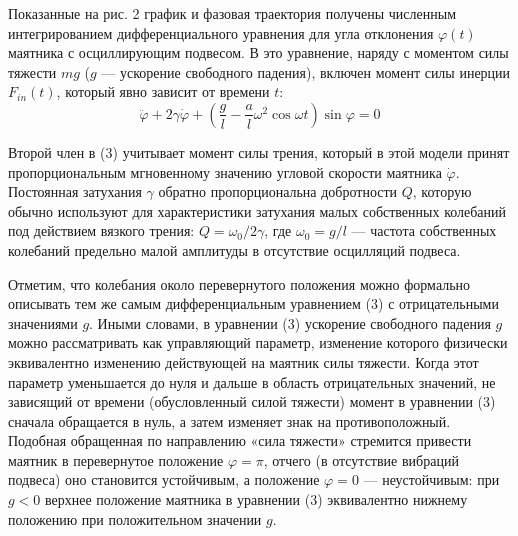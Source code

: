 \documentclass[a4paper,12pt]{article} %
\begin{document}
Показанные на рис. 2 график и фазовая траектория получены численным интегрированием дифференциального уравнения для угла отклонения $\varphi(t)$ маятника с осциллирующим подвесом. В это уравнение, наряду с моментом силы тяжести $mg$ ($g$ — ускорение свободного падения), включен момент силы инерции $F_{in}(t)$, который явно зависит от времени $t$:
\begin{equation}
\ddot{\varphi} + 2\gamma\dot{\varphi} + \left(\frac{g}{l} - \frac{a}{l}\omega^2\cos\omega t\right)\sin\varphi = 0
\end{equation}

Второй член в (3) учитывает момент силы трения, который в этой модели принят пропорциональным мгновенному значению угловой скорости маятника $\dot\varphi$. Постоянная затухания $\gamma$ обратно пропорциональна добротности $Q$, которую обычно используют для характеристики затухания малых собственных колебаний под действием вязкого трения: $Q = \omega_0/2\gamma$, где  $\omega_0 = g/l$  — частота собственных колебаний предельно малой амплитуды в отсутствие осцилляций подвеса.

Отметим, что колебания около перевернутого положения можно формально описывать тем же самым дифференциальным уравнением (3) с отрицательными значениями $g$. Иными словами, в уравнении (3) ускорение свободного падения $g$ можно рассматривать как управляющий параметр, изменение которого физически эквивалентно изменению действующей на маятник силы тяжести. Когда этот параметр уменьшается до нуля и дальше в область отрицательных значений, не зависящий от времени (обусловленный силой тяжести) момент в уравнении (3) сначала обращается в нуль, а затем изменяет знак на противоположный. Подобная обращенная по направлению «сила тяжести» стремится привести маятник в перевернутое положение $\varphi = \pi$, отчего (в отсутствие вибраций подвеса) оно становится устойчивым, а положение $\varphi = 0$ — неустойчивым: при $g < 0$ верхнее положение маятника в уравнении (3) эквивалентно нижнему положению при положительном значении $g$.
\newpage
\end{document}
